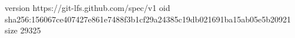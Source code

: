 version https://git-lfs.github.com/spec/v1
oid sha256:156067ce407427e861e7488f3b1cf29a24385c19db021691ba15ab05e5b20921
size 29325
